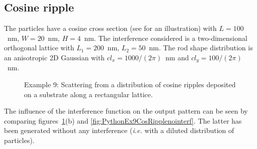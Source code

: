 \subsection{Cosine ripple}
The particles have a cosine cross section (see  for an illustration) with $L=100$~nm, $W=20$~nm, $H=4$~nm.
The interference considered is a two-dimensional orthogonal lattice with $L_1=200$~nm, $L_2=50$~nm. The rod shape distribution is an anisotropic 2D Gaussian with $cl_x=1000/(2\pi)$~nm and  $cl_y=100/(2\pi)$~nm.

\begin{figure}[H]
\hfill
{}
\hfill
{}
\hfill
\caption{Example 9: Scattering from a distribution of cosine ripples deposited on a substrate along a rectangular lattice.}
\label{fig:PythonEx9CosRipple}
\end{figure}

The influence of the interference function on the output pattern can be seen by comparing figures~\ref{fig:PythonEx9CosRipple}(b) and \ref{fig:PythonEx9CosRipplenointerf}. The latter has been generated without any interference (\textit{i.e.} with a diluted distribution of particles).

